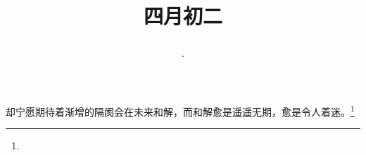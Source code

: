 \title{\date[d=9,m=5,y=2024][year:cn-y,年,month:cn,day:cn,日,·,weekday]·四月初二 }
却宁愿期待着渐增的隔阂会在未来和解，而和解愈是遥遥无期，愈是令人着迷。\footnote{ }

